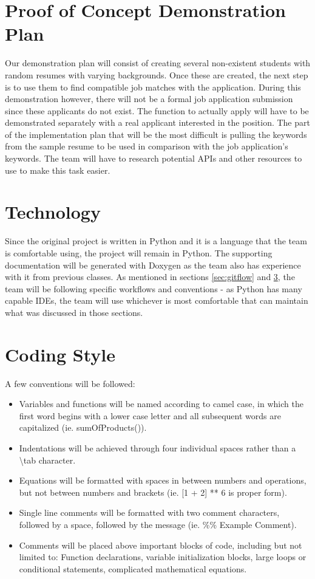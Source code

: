 \documentclass{article}
\begin{document}
\section{Proof of Concept Demonstration Plan}
Our demonstration plan will consist of creating several non-existent students with random resumes with varying backgrounds. Once these are created, the next step is to use them to find compatible job matches with the application. During this demonstration however, there will not be a formal job application submission since these applicants do not exist. The function to actually apply will have to be demonstrated separately with a real applicant interested in the position. The part of the implementation plan that will be the most difficult is pulling the keywords from the sample resume to be used in comparison with the job application's keywords. The team will have to research potential APIs and other resources to use to make this task easier.

\section{Technology}
Since the original project is written in Python and it is a language that the team is comfortable using, the project will remain in Python. The supporting documentation will be generated with Doxygen as the team also has experience with it from previous classes. As mentioned in sections \ref{sec:gitflow} and \ref{sec:style}, the team will be following specific workflows and conventions - as Python has many capable IDEs, the team will use whichever is most comfortable that can maintain what was discussed in those sections. 

\section{Coding Style} \label{sec:style}
A few conventions will be followed:
\begin{itemize}
  \item Variables and functions will be named according to camel case, in which the first word begins with a lower case letter and all subsequent words are capitalized (ie. sumOfProducts()).
  \item Indentations will be achieved through four individual spaces rather than a \textbackslash tab character.
  \item Equations will be formatted with spaces in between numbers and operations, but not between numbers and brackets (ie. [1 + 2] ** 6 is proper form).
  \item Single line comments will be formatted with two comment characters, followed by a space, followed by the message (ie. \%\% Example Comment).
  \item Comments will be placed above important blocks of code, including but not limited to: Function declarations, variable initialization blocks, large loops or conditional statements, complicated mathematical equations. 
\end{itemize}
\end{document}
